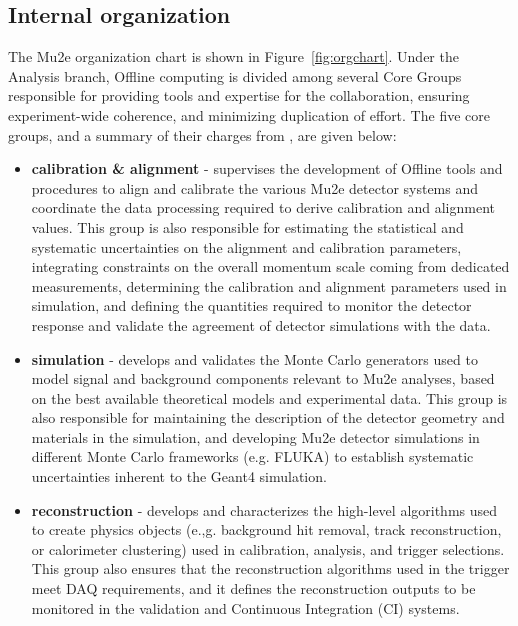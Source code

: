 \subsection{Internal organization}
The Mu2e organization chart is shown in Figure~\ref{fig:orgchart}. Under the Analysis branch, Offline computing is divided among several Core Groups responsible for providing tools and expertise for the collaboration, ensuring experiment-wide coherence, and minimizing duplication of effort. The five core groups, and a summary of their charges from \cite{corecharge}, are given below:

\begin{itemize}

\item[] {\bf calibration \& alignment} - supervises the development of Offline tools and procedures to align and calibrate the various Mu2e detector systems and coordinate the data processing required to derive calibration and alignment values. This group is also responsible for estimating the statistical and systematic uncertainties on the alignment and calibration parameters, integrating constraints on the overall momentum scale coming from dedicated measurements, determining the calibration and alignment parameters used in simulation, and defining the quantities required to monitor the detector response and validate the agreement of detector simulations with the data.

\item[] {\bf simulation} - develops and validates the Monte Carlo generators used to model signal and background components relevant to Mu2e analyses, based on the best available theoretical models and experimental data. This group is also responsible for maintaining the description of the detector geometry and materials in the simulation, and developing Mu2e detector simulations in different Monte Carlo frameworks (e.g. FLUKA) to establish systematic uncertainties inherent to the Geant4 simulation.

\item[] {\bf reconstruction} - develops and characterizes the high-level algorithms used to create physics objects (e.,g. background hit removal, track reconstruction, or calorimeter clustering) used in calibration, analysis, and trigger selections. This group also ensures that the reconstruction algorithms used in the trigger meet DAQ requirements, and it defines the reconstruction outputs to be monitored in the validation and Continuous Integration (CI) systems. 


\end{itemize}
